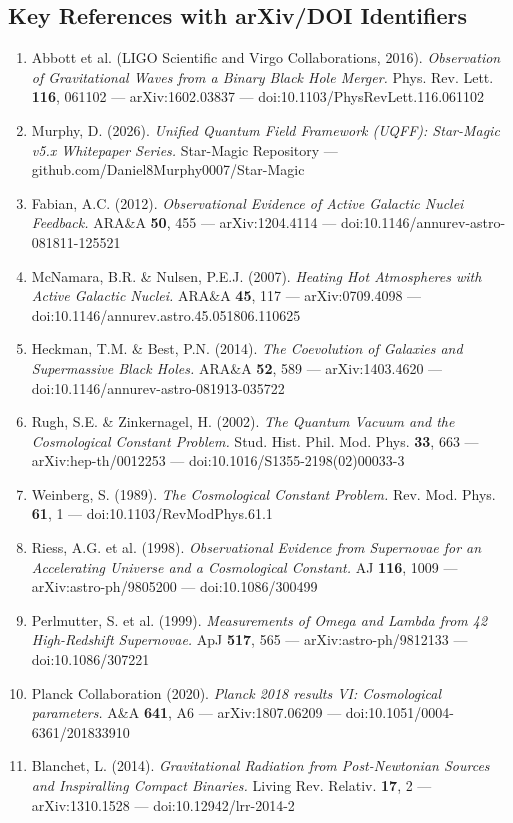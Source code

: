\documentclass[12pt,a4paper]{article}
\begin{document}
\subsection{Key References with arXiv/DOI Identifiers}

\begin{enumerate}
  \item Abbott et al. (LIGO Scientific and Virgo Collaborations, 2016). \emph{Observation of Gravitational Waves from a Binary Black Hole Merger.} Phys. Rev. Lett. \textbf{116}, 061102 --- arXiv:1602.03837 --- doi:10.1103/PhysRevLett.116.061102
  \item Murphy, D. (2026). \emph{Unified Quantum Field Framework (UQFF): Star-Magic v5.x Whitepaper Series.} Star-Magic Repository --- github.com/Daniel8Murphy0007/Star-Magic
  \item Fabian, A.C. (2012). \emph{Observational Evidence of Active Galactic Nuclei Feedback.} ARA\&A \textbf{50}, 455 --- arXiv:1204.4114 --- doi:10.1146/annurev-astro-081811-125521
  \item McNamara, B.R. \& Nulsen, P.E.J. (2007). \emph{Heating Hot Atmospheres with Active Galactic Nuclei.} ARA\&A \textbf{45}, 117 --- arXiv:0709.4098 --- doi:10.1146/annurev.astro.45.051806.110625
  \item Heckman, T.M. \& Best, P.N. (2014). \emph{The Coevolution of Galaxies and Supermassive Black Holes.} ARA\&A \textbf{52}, 589 --- arXiv:1403.4620 --- doi:10.1146/annurev-astro-081913-035722
  \item Rugh, S.E. \& Zinkernagel, H. (2002). \emph{The Quantum Vacuum and the Cosmological Constant Problem.} Stud. Hist. Phil. Mod. Phys. \textbf{33}, 663 --- arXiv:hep-th/0012253 --- doi:10.1016/S1355-2198(02)00033-3
  \item Weinberg, S. (1989). \emph{The Cosmological Constant Problem.} Rev. Mod. Phys. \textbf{61}, 1 --- doi:10.1103/RevModPhys.61.1
  \item Riess, A.G. et al. (1998). \emph{Observational Evidence from Supernovae for an Accelerating Universe and a Cosmological Constant.} AJ \textbf{116}, 1009 --- arXiv:astro-ph/9805200 --- doi:10.1086/300499
  \item Perlmutter, S. et al. (1999). \emph{Measurements of Omega and Lambda from 42 High-Redshift Supernovae.} ApJ \textbf{517}, 565 --- arXiv:astro-ph/9812133 --- doi:10.1086/307221
  \item Planck Collaboration (2020). \emph{Planck 2018 results VI: Cosmological parameters.} A\&A \textbf{641}, A6 --- arXiv:1807.06209 --- doi:10.1051/0004-6361/201833910
  \item Blanchet, L. (2014). \emph{Gravitational Radiation from Post-Newtonian Sources and Inspiralling Compact Binaries.} Living Rev. Relativ. \textbf{17}, 2 --- arXiv:1310.1528 --- doi:10.12942/lrr-2014-2
\end{enumerate}
\end{document}
